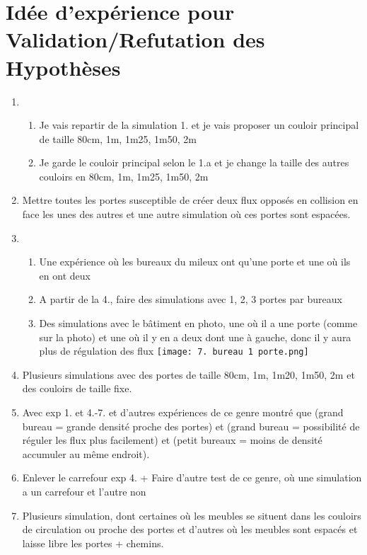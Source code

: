 \documentclass[12pt]{article}
\begin{document}
\section{Idée d'expérience pour Validation/Refutation des Hypothèses}

\begin{enumerate}

    \item
    \begin{enumerate}
        \item Je vais repartir de la simulation 1. et je vais proposer un couloir principal de taille 80cm, 1m, 1m25, 1m50, 2m
        \item Je garde le couloir principal selon le 1.a et je change la taille des autres couloirs en 80cm, 1m, 1m25, 1m50, 2m
    \end{enumerate}

    \item Mettre toutes les portes susceptible de créer deux flux opposés en collision en face les unes des autres et une autre simulation où ces portes sont espacées.
    
    \item 
    \begin{enumerate}
        \item Une expérience où les bureaux du mileux ont qu'une porte et une où ils en ont deux
        \item A partir de la 4., faire des simulations avec 1, 2, 3 portes par bureaux  
        \item Des simulations avec le bâtiment en photo, une où il a une porte (comme sur la photo) et une où il y en a deux dont une à gauche, donc il y aura plus de régulation des flux
        \newline\texttt{[image: 7. bureau 1 porte.png]}\newline
    \end{enumerate}

    \item Plusieurs simulations avec des portes de taille 80cm, 1m, 1m20, 1m50, 2m et des couloirs de taille fixe.
    
    \item Avec exp 1. et 4.-7. et d'autres expériences de ce genre montré que (grand bureau = grande densité proche des portes) et (grand bureau = possibilité de réguler les flux plus facilement) et (petit
    bureaux = moins de densité accumuler au même endroit).
    
    \item Enlever le carrefour exp 4. + Faire d'autre test de ce genre, où une simulation a un carrefour et l'autre non
    
    \item Plusieurs simulation, dont certaines où les meubles se situent dans les couloirs de circulation ou proche des portes et d'autres où les meubles sont espacés et laisse libre les portes + chemins.
    
    

\end{enumerate}
\end{document}
